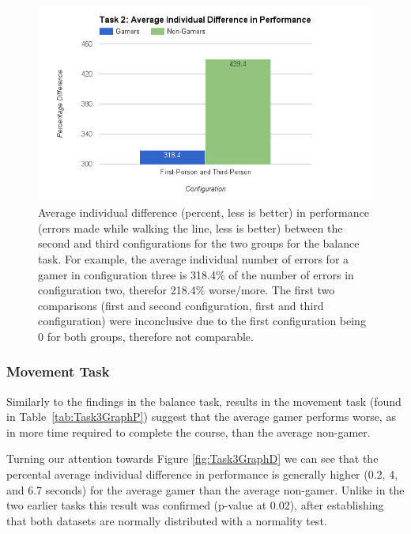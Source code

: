 \documentclass[runningheads,a4paper,oribibl]{llncs}
\begin{document}
\begin{figure}
   \centering
   \includegraphics[width=\textwidth]{ExternalMaterial/Task2GraphD}
   \caption{Average individual difference (percent, less is better) in performance (errors made while walking the line, less is better) between the second and third configurations for the two groups for the balance task. For example, the average individual number of errors for a gamer in configuration three is 318.4\% of the number of errors in configuration two, therefor 218.4\% worse/more. The first two comparisons (first and second configuration, first and third configuration) were inconclusive due to the first configuration being 0 for both groups, therefore not comparable.} \label{fig:Task2GraphD}
\end{figure}











\subsubsection{Movement Task}
Similarly to the findings in the balance task, results in the movement task (found in Table~\ref{tab:Task3GraphP}) suggest that the average gamer performs worse, as in more time required to complete the course, than the average non-gamer. 

Turning our attention towards Figure \ref{fig:Task3GraphD} we can see that the percental average individual difference in performance is generally higher (0.2, 4, and 6.7 seconds) for the average gamer than the average non-gamer. Unlike in the two earlier tasks this result was confirmed (p-value at 0.02), after establishing that both datasets are normally distributed with a normality test.
\end{document}
